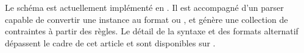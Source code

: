 
Le schéma est actuellement implémenté en {\XML}. Il est accompagné d'un parser capable de convertir une instance au format {\JSON} ou {\DZN}, et génère une collection de contraintes à partir des règles. %
%
Le détail de la syntaxe {\XML} et des formats alternatif dépassent le cadre de cet article et sont disponibles sur \cite{USPsite}.
 



